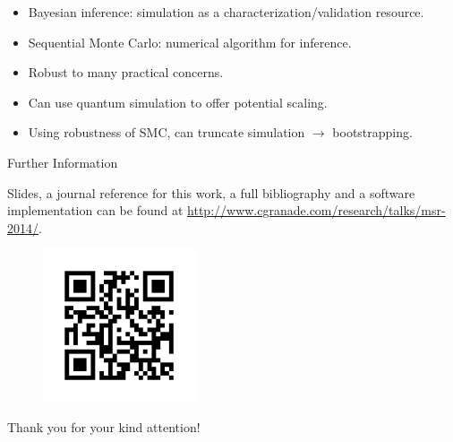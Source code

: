 \documentclass[xcolor=dvipsnames, compress]{beamer}
\begin{document}
\begin{frame}{}

  \begin{itemize}
   \item<+-> Bayesian inference: simulation as a characterization/validation resource.
   \item<+-> Sequential Monte Carlo: numerical algorithm for inference.
   \item<+-> Robust to many practical concerns.
   \item<+-> Can use quantum simulation to offer potential scaling.
   \item<+-> Using robustness of SMC, can truncate simulation $\to$ bootstrapping.
  \end{itemize}

\end{frame}

\begin{frame}{Further Information}

  Slides, a journal reference for this work, a full bibliography and a software implementation can
  be found at \url{http://www.cgranade.com/research/talks/msr-2014/}.

  \begin{figure}
     \includegraphics[width=0.4\textwidth]{link}
  \end{figure}

  \begin{block}{}
    Thank you for your kind attention!
  \end{block}
\end{frame}


  
\end{document}
